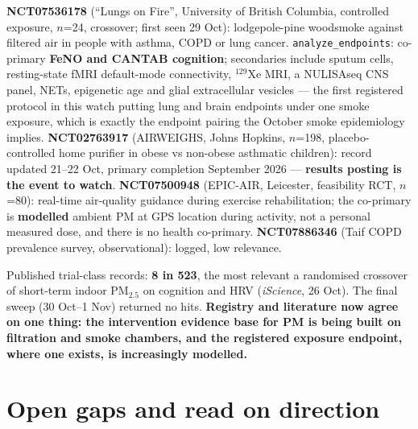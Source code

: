\documentclass[10pt]{article}
\begin{document}
\vspace{1.5mm}
\textbf{NCT07536178} (``Lungs on Fire'', University of British Columbia, controlled exposure, $n$=24,
crossover; first seen 29 Oct): lodgepole-pine woodsmoke against filtered air in people with asthma, COPD or
lung cancer. \texttt{analyze\_endpoints}: co-primary \textbf{FeNO and CANTAB cognition}; secondaries
include sputum cells, resting-state fMRI default-mode connectivity, $^{129}$Xe MRI, a NULISAseq CNS panel,
NETs, epigenetic age and glial extracellular vesicles --- the first registered protocol in this watch
putting lung and brain endpoints under one smoke exposure, which is exactly the endpoint pairing the
October smoke epidemiology implies. \textbf{NCT02763917} (AIRWEIGHS, Johns Hopkins, $n$=198, placebo-
controlled home purifier in obese vs non-obese asthmatic children): record updated 21--22 Oct, primary
completion September 2026 --- \textbf{results posting is the event to watch}. \textbf{NCT07500948}
(EPIC-AIR, Leicester, feasibility RCT, $n$=80): real-time air-quality guidance during exercise
rehabilitation; the co-primary is \textbf{modelled} ambient PM at GPS location during activity, not a
personal measured dose, and there is no health co-primary. \textbf{NCT07886346} (Taif COPD prevalence
survey, observational): logged, low relevance.

\vspace{1.5mm}
Published trial-class records: \textbf{8 in 523}, the most relevant a randomised crossover of short-term
indoor PM$_{2.5}$ on cognition and HRV (\textit{iScience}, 26 Oct). The final sweep (30 Oct--1 Nov)
returned no hits. \textbf{Registry and literature now agree on one thing: the intervention evidence base
for PM is being built on filtration and smoke chambers, and the registered exposure endpoint, where one
exists, is increasingly modelled.}

\vspace{4mm}

\section*{\sffamily\bfseries\color{Deep}Open gaps and read on direction}
\vspace{-1.5mm}{\color{Coral}\rule{\linewidth}{1.1pt}}\vspace{2.5mm}
\end{document}
